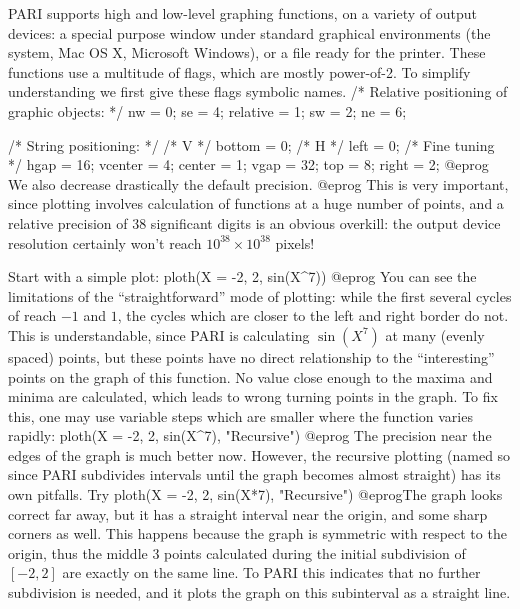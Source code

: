PARI supports high and low-level graphing functions, on a variety of output
devices: a special purpose window under standard graphical environments (the
 system, Mac OS X, Microsoft Windows), or a 
file ready for the printer. These functions use a multitude of flags, which
are mostly power-of-2. To simplify understanding we first give these flags
symbolic names.
\bprog
  /* Relative positioning of graphic objects: */
  nw       = 0;  se       = 4;  relative = 1;
  sw       = 2;  ne       = 6;

  /* String positioning: */
  /* V */ bottom  =  0;   /* H */  left   = 0;   /* Fine tuning */ hgap = 16;
          vcenter =  4;            center = 1;                     vgap = 32;
          top     =  8;            right  = 2;
@eprog\noindent
We also decrease drastically the default precision.
\bprog
@eprog\noindent
This is very important, since plotting involves calculation of functions at
a huge number of points, and a relative precision of 38 significant digits
is an obvious overkill: the output device resolution certainly won't reach
$10^{38} \times 10^{38}$ pixels!

Start with a simple plot:
\bprog
  ploth(X = -2, 2, sin(X^7))
@eprog\noindent
You can see the limitations of the ``straightforward'' mode of plotting:
while the first several cycles of  reach $-1$ and $1$, the cycles
which are closer to the left and right border do not. This is understandable,
since PARI is calculating $\sin(X^7)$ at many (evenly spaced) points, but
these points have no direct relationship to the ``interesting'' points on
the graph of this function.  No value close enough to the maxima and minima
are calculated, which leads to wrong turning points in the graph. To fix
this, one may use variable steps which are smaller where the function varies
rapidly:
\bprog
  ploth(X = -2, 2, sin(X^7), "Recursive")
@eprog\noindent
The precision near the edges of the graph is much better now.
However, the recursive plotting (named so since PARI subdivides intervals
until the graph becomes almost straight) has its own pitfalls.  Try
\bprog
  ploth(X = -2, 2, sin(X*7), "Recursive")
@eprog\noindent The graph looks correct far away, but it has a straight
interval near the origin, and some sharp corners as well.  This happens
because the graph is symmetric with respect to the origin, thus the middle 3
points calculated during the initial subdivision of $[-2,2]$ are exactly on
the same line.  To PARI this indicates that no further subdivision is needed,
and it plots the graph on this subinterval as a straight line.

